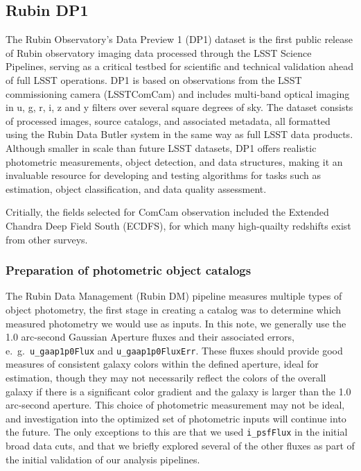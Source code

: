 \subsection{Rubin DP1}
\label{sec:data:dp1}

The Rubin Observatory’s Data Preview 1 (DP1) dataset is the first public release of Rubin observatory imaging data processed through the LSST Science Pipelines, serving as a critical testbed for scientific and technical validation ahead of full LSST operations.  DP1 is based on observations from the LSST commissioning camera (LSSTComCam) and includes multi-band optical imaging in u, g, r, i, z and y filters over several square degrees of sky.  The dataset consists of processed images, source catalogs, and associated metadata, all formatted using the Rubin Data Butler system in the same way as full LSST data products.  Although smaller in scale than future LSST datasets, DP1 offers realistic photometric measurements, object detection, and data structures, making it an invaluable resource for developing and testing algorithms for tasks such as \photoz estimation, object classification, and data quality assessment.

Critially, the fields selected for ComCam observation included the Extended Chandra Deep Field South (ECDFS), for which many high-quailty redshifts exist from other surveys. 


\subsubsection{Preparation of photometric object catalogs}
\label{sec:data:dp1:preparation}

The Rubin Data Management (Rubin DM) pipeline measures multiple types of object photometry, the first stage in creating a \photoz catalog was to determine which measured photometry we would use as inputs.  In this note, we generally use the 1.0 arc-second Gaussian Aperture fluxes and their associated errors, e.~g.~\texttt{u\_gaap1p0Flux} and \texttt{u\_gaap1p0FluxErr}.  These fluxes should provide good measures of consistent galaxy colors within the defined aperture, ideal for \photoz estimation, though they may not necessarily reflect the colors of the overall galaxy if there is a significant color gradient and the galaxy is larger than the 1.0 arc-second aperture.  This choice of photometric measurement may not be ideal, and investigation into the optimized set of photometric inputs will continue into the future.   The only exceptions to this are that we used \texttt{i\_psfFlux} in the initial broad data cuts, and that we briefly explored several of the other fluxes as part of the initial validation of our \photoz analysis pipelines. 

